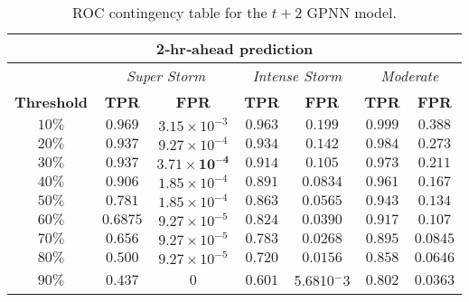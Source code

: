 \begin{table}[h]
	\centering
	\caption{ROC contingency table for the $t+2$ GPNN model.}
	\label{table:rocgpnn2h}
	\begin{tabular}
		{c| c c | c c | c c}
		\hline
		\multicolumn{7}{c}{\textbf{2‐hr‐ahead prediction}} \\ 
		\hline
		 & \multicolumn{2}{c}{\textit{Super Storm}} & \multicolumn{2}{c}{\textit{Intense Storm}} & \multicolumn{2}{c}{\textit{Moderate}} \\ 
		\hline
		\textbf{Threshold} & \textbf{TPR} & \textbf{FPR} & \textbf{TPR} & \textbf{FPR} & \textbf{TPR} & \textbf{FPR} \\ 
		\hline
		$10\%$ & $0.969$ & $3.15\times10^{-3}$ & $0.963$ & $0.199$ & $0.999$ & $0.388$ \\ 
		$20\%$ & $0.937$ & $9.27\times10^{-4}$ & $0.934$ & $0.142$ & $0.984$ & $0.273$ \\ 
		$30\%$ & $\mathbf{0.937}$ & $\mathbf{3.71\times10^{-4}}$ & $\mathbf{0.914}$ & $\mathbf{0.105}$ & $0.973$ & $0.211$ \\ 
		$40\%$ & $0.906$ & $1.85\times10^{-4}$ & $0.891$ & $0.0834$ & $0.961$ & $0.167$ \\ 
		$50\%$ & $0.781$ & $1.85\times10^{-4}$ & $0.863$ & $0.0565$ & $0.943$ & $0.134$ \\ 
		$60\%$ & $0.6875$ & $9.27\times10^{-5}$ & $0.824$ & $0.0390$ & $\mathbf{0.917}$ & $\mathbf{0.107}$ \\ 
		$70\%$ & $0.656$ & $9.27\times10^{-5}$ & $0.783$ & $0.0268$ & $0.895$ & $0.0845$ \\ 
		$80\%$ & $0.500$ & $9.27\times10^{-5}$ & $0.720$ & $0.0156$ & $0.858$ & $0.0646$ \\ 
		$90\%$ & $0.437$ & $0$ & $0.601$ & 5.6810$^-3$ & $0.802$ & $0.0363$\\
		\hline
	\end{tabular}
\end{table}

